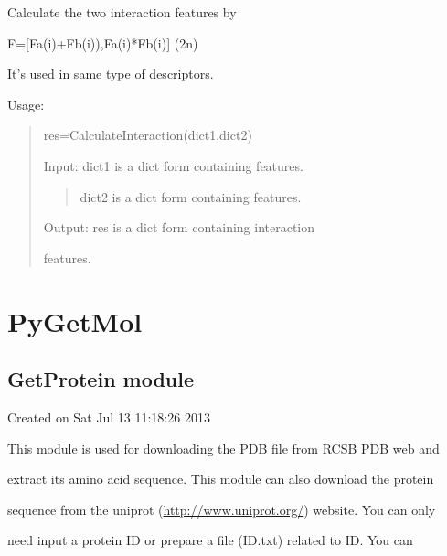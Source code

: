 \documentclass[letterpaper,10pt,english]{sphinxmanual}
\begin{document}

\begin{fulllineitems}
\label{reference/PyInteraction_module:PyInteraction.CalculateInteraction3}
Calculate the two interaction features by

F={[}Fa(i)+Fb(i)),Fa(i)*Fb(i){]} (2n)

It's used in same type of descriptors.

Usage:
\begin{quote}

res=CalculateInteraction(dict1,dict2)

Input: dict1 is a dict form containing features.
\begin{quote}

dict2 is a dict form containing features.
\end{quote}

Output: res is a dict form containing interaction

features.
\end{quote}

\end{fulllineitems}



\section{PyGetMol}
\label{reference/PyGetMol:pygetmol}\label{reference/PyGetMol::doc}

\subsection{GetProtein module}
\label{reference/GetProtein:getprotein-module}\label{reference/GetProtein::doc}\label{reference/GetProtein:module-GetProtein}
Created on Sat Jul 13 11:18:26 2013

This module is used for downloading the PDB file from RCSB PDB web and

extract its amino acid sequence. This module can also download the protein

sequence from the uniprot (\url{http://www.uniprot.org/}) website. You can only

need input a protein ID or prepare a file (ID.txt) related to ID. You can
\end{document}

